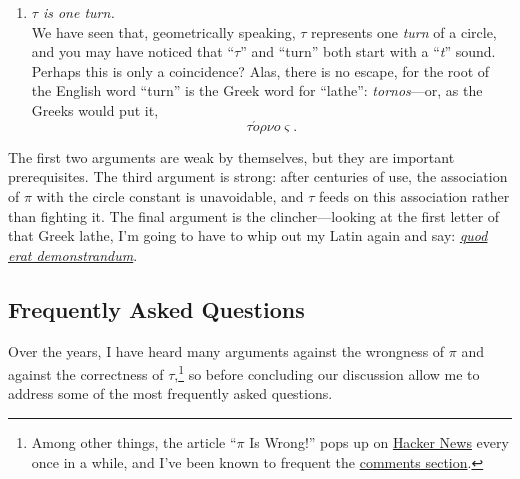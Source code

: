 \documentclass{article}
\begin{document}
\begin{enumerate}
  \item \emph{$\tau$ is one turn.} \\ We have seen that, geometrically speaking, $\tau$ represents one \emph{turn} of a circle, and you may have noticed that ``$\tau$'' and ``turn'' both start with a ``\emph{t}'' sound. Perhaps this is only a coincidence? Alas, there is no escape, for the root of the English word ``turn'' is the Greek word for ``lathe'': \emph{tornos}---or, as the Greeks would put it, \[ \tau \acute{o}\rho\nu o\varsigma. \]
  
\end{enumerate}

The first two arguments are weak by themselves, but they are important prerequisites. The third argument is strong: after centuries of use, the association of $\pi$ with the circle constant is unavoidable, and $\tau$ feeds on this association rather than fighting it. The final argument is the clincher---looking at the first letter of that Greek lathe, I'm going to have to whip out my Latin again and say:  \href{http://en.wikipedia.org/wiki/Q.E.D.}{\emph{quod erat demonstrandum}}.

  \subsection{Frequently Asked Questions} %
  \label{sec:faq}

Over the years, I have heard many arguments against the wrongness of $\pi$ and against the correctness of $\tau$,\footnote{Among other things, the article ``$\pi$ Is Wrong!'' pops up on \href{http://news.ycombinator.com/news}{Hacker News} every once in a while, and I've been known to frequent the  \href{http://news.ycombinator.com/item?id=912082}{comments section}.} so before concluding our discussion allow me to address some of the most frequently asked questions.
\end{document}
